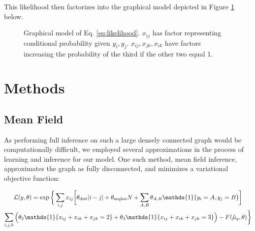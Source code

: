 \documentclass{article}
\begin{document}
This likelihood then factorizes into the graphical model depicted in Figure \ref{fig:model} below.
\begin{figure}[H]
\centering
{}
\caption{Graphical model of Eq. \ref{eq:likelihood}. $x_{ij}$ has factor representing conditional probability given $y_i, y_j$. $x_{ij}, x_{jk}, x_{ik}$ have factors increasing the probability of the third if the other two equal 1.}
\label{fig:model}
\end{figure}

\section{Methods}
\subsection{Mean Field}

As performing full inference on such a large densely connected graph would be computationally difficult, we employed several approximations in the process of learning and inference for our model. One such method, mean field inference, approximates the graph as fully disconnected, and minimizes a variational objective function:

\begin{multline} \label{eq:mflikelihood}
\mathcal{L}(y, \theta) = \exp\bigg\{\sum_{i, j} x_{ij}\bigg[\theta_{\textmd{dist}}|i - j|+ \theta_{\textmd{seqlen}}N + \sum_{A, B} \theta_{A, B}\mathds{1}\{y_i = A, y_j = B\}\bigg] \\
\sum_{i, j, k}\Big(\theta_2\mathds{1}\{x_{ij} + x_{ik} + x_{jk} = 2\} + \theta_3\mathds{1}\{x_{ij} + x_{ik} + x_{jk} = 3\}\Big)  - F(\hat{\mu}_{y}, \theta) \bigg\}
\end{multline}
\end{document}
